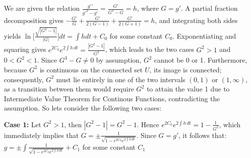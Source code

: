 \documentclass[12pt]{article}
\theoremstyle{plain}
\theoremstyle{definition}
\theoremstyle{remark}
\begin{document}
   We are given the relation \(\frac{g\prime\prime}{g\prime^3 - g\prime} = \frac{G'}{G^3 - G} = h\), where \(G = g\prime\). A partial fraction decomposition gives \(-\frac{G'}{G} + \frac{G'}{2(G-1)} + \frac{G'}{2(G+1)} = h\), and integrating both sides yields  \(\ln\big[\frac{\sqrt{|G^2 - 1|}}{|G|}\big]dt = \int h dt+C_0\) for some constant \(C_0\). Exponentiating and squaring gives \(e^{2C_0} e^{2\int h\, dt} = \frac{|G^2 - 1|}{G^2}\), which leads to the two cases \(G^2 > 1\) and \(0 < G^2 < 1\). Since \(G^3 - G \neq 0\) by assumption, \(G^2\) cannot be 0 or 1. Furthermore, because \(G^2\) is continuous on the connected set \(U\), its image is connected; consequently, \(G^2\) must lie entirely in one of the two intervals \((0,1)\) or \((1,\infty)\), as a transition between them would require \(G^2\) to attain the value 1 due to Intermediate Value Theorem for Continous Functions, contradicting the assumption. So lets consider the following two cases:
   
   \textbf{Case 1:} Let \(G^2 > 1\), then \( |G^2 - 1| = G^2 - 1 \). Hence \( e^{2C_0}e^{2\int h\, dt} = 1 - \tfrac{1}{G^2}\), which immediately implies that \( G = \pm \frac{1}{\sqrt{1 -e^{2C_0} e^{2\int h\, dt}}}\). Since \(G = g\prime\), it follows that: \( g = \pm \int \frac{1}{\sqrt{1 - e^{2C_0}e^{2\int h\, dt}}}+C_1\) for some constant \(C_1\)
\end{document}
